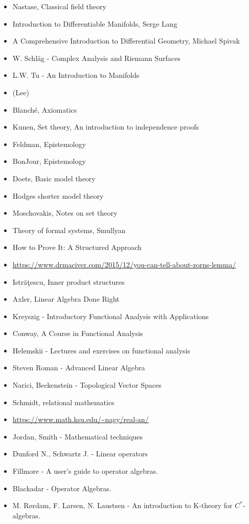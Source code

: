 \documentclass{report}
\begin{document}
\begin{itemize}
\item Nastase, Classical field theory
\item Introduction to Differentiable Manifolds, Serge Lang
\item A Comprehensive Introduction to Differential Geometry, Michael Spivak
\item W. Schläg - Complex Analysis and Riemann Surfaces
\item L.W. Tu - An Introduction to Manifolds
\item (Lee)
\item Blanché, Axiomatics
\item Kunen, Set theory, An introduction to independence proofs
\item Feldman, Epistemology
\item BonJour, Epistemology
\item Doets, Basic model theory
\item Hodges shorter model theory
\item Moschovakis, Notes on set theory
\item Theory of formal systems, Smullyan
\item How  to  Prove  It:  A  Structured  Approach
\item \url{https://www.drmaciver.com/2015/12/you-can-tell-about-zorns-lemma/}
\item Istrăţescu, Inner product structures
\item Axler, Linear Algebra Done Right
\item Kreyszig - Introductory Functional Analysis with Applications
\item Conway, A Course in Functional Analysis
\item Helemskii - Lectures and exercises on functional analysis
\item Steven Roman - Advanced Linear Algebra
\item Narici, Beckenstein - Topological Vector Spaces
\item Schmidt, relational mathematics
\item \url{https://www.math.ksu.edu/~nagy/real-an/}
\item Jordan, Smith - Mathematical techniques
\item Dunford N., Schwartz J. - Linear operators
\item Fillmore - A user's guide to operator algebras.
\item Blackadar - Operator Algebras.
\item M.  Rørdam,  F.  Larsen,  N.  Laustsen - An  introduction  to  K-theory  for $C^*$-algebras.

\end{itemize}
\end{document}
